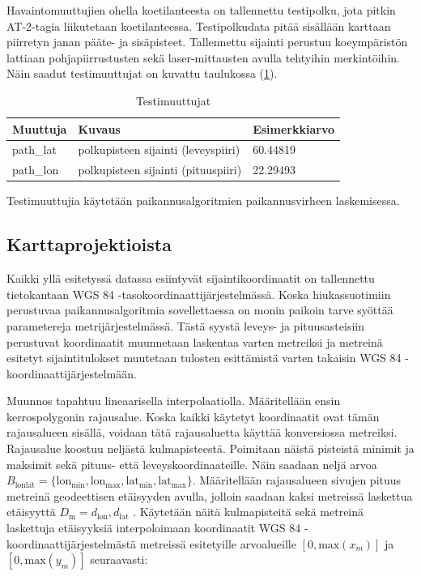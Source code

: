 \documentclass[
  12pt,
  a4paper, twoside]{book}
\begin{document}
Havaintomuuttujien ohella koetilanteesta on tallennettu testipolku, jota pitkin AT-2-tagia liikutetaan koetilanteessa. Testipolkudata pitää sisällään karttaan piirretyn janan pääte- ja sisäpisteet. Tallennettu sijainti perustuu koeympäristön lattiaan pohjapiirrustusten sekä laser-mittausten avulla tehtyihin merkintöihin. Näin saadut testimuuttujat on kuvattu taulukossa (\ref{tab:testimuuttujat}).

\def\arraystretch{1.25} 
\begin{table}[H]
\centering
\begin{tabular}{|l|l|l|}
\hline
Muuttuja & Kuvaus & Esimerkkiarvo\\
\hline
path\_lat & polkupisteen sijainti (leveyspiiri) & 60.44819 \\
path\_lon & polkupisteen sijainti (pituuspiiri) & 22.29493 \\
\hline
\end{tabular}
\caption{Testimuuttujat}
\label{tab:testimuuttujat}
\end{table}

\noindent Testimuuttujia käytetään paikannusalgoritmien paikannusvirheen laskemisessa.

\subsection{Karttaprojektioista} \label{karttaprojektioista}

Kaikki yllä esitetyssä datassa esiintyvät sijaintikoordinaatit on tallennettu tietokantaan WGS 84 -tasokoordinaattijärjestelmässä. Koska hiukassuotimiin perustuvaa paikannusalgoritmia sovellettaessa on monin paikoin tarve syöttää parametereja metrijärjestelmässä. Tästä syystä leveys- ja pituusasteisiin perustuvat koordinaatit muunnetaan laskentaa varten metreiksi ja metreinä esitetyt sijaintitulokset muutetaan tulosten esittämistä varten takaisin WGS 84 -koordinaattijärjestelmään.

Muunnos tapahtuu lineaarisella interpolaatiolla. Määritellään ensin kerrospolygonin rajausalue. Koska kaikki käytetyt koordinaatit ovat tämän rajausalueen sisällä, voidaan tätä rajausaluetta käyttää konversiossa metreiksi. Rajausalue koostuu neljästä kulmapisteestä. Poimitaan näistä pisteistä minimit ja maksimit sekä pituus- että leveyskoordinaateille. Näin saadaan neljä arvoa \(B_{\text{lonlat}}=\{\text{lon}_{\text{min}}, \text{lon}_{\text{max}}, \text{lat}_{\text{min}}, \text{lat}_{\text{max}}\}\). Määritellään rajausalueen sivujen pituus metreinä geodeettisen etäisyyden avulla, jolloin saadaan kaksi metreissä laskettua etäisyyttä \(D_{\text{m}}={d_{\text{lon}}, d_{\text{lat}}}\) . Käytetään näitä kulmapisteitä sekä metreinä laskettuja etäisyyksiä interpoloimaan koordinaatit WGS 84 -koordinaattijärjestelmästä metreissä esitetyille arvoalueille \([0, \text{max}(x_m)]\) ja \([0, \text{max}(y_m)]\) seuraavasti:
\end{document}
